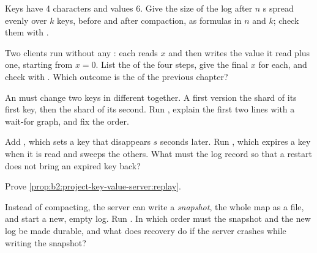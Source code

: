 \begin{exercise}[$\star$]\label{exo:b2:project-key-value-server:4}
Keys have 4 characters and values 6. Give the size of the log after $n$ s spread evenly over $k$ keys, before
and after compaction, as formulas in $n$ and $k$; check them with .
\end{exercise}

\begin{exercise}[$\star\star$]\label{exo:b2:project-key-value-server:5}
Two clients run without any : each reads $x$ and then writes the value it read plus one, starting from $x = 0$. List
the  of the four steps, give the final $x$ for each, and check with . Which outcome
is the  of the previous chapter?
\end{exercise}

\begin{exercise}[$\star\star$]\label{exo:b2:project-key-value-server:6}
An  must change two keys in different  together. A first version  the shard of its first
key, then the shard of its second. Run , explain the first two lines with a wait-for graph,
and fix the order.
\end{exercise}

\begin{exercise}[$\star\star$]\label{exo:b2:project-key-value-server:7}
Add , which sets a key that disappears $s$ seconds later. Run , which expires a key
when it is read and sweeps the others. What must the log record so that a restart does not bring an expired key back?
\end{exercise}

\begin{exercise}[$\star\star$]\label{exo:b2:project-key-value-server:8}
Prove \cref{prop:b2:project-key-value-server:replay}.
\end{exercise}

\begin{exercise}[$\star\star$]\label{exo:b2:project-key-value-server:9}
Instead of compacting, the server can write a \emph{snapshot}, the whole map as a file, and start a new, empty log.
Run . In which order must the snapshot and the new log be made durable, and what does recovery do
if the server crashes while writing the snapshot?
\end{exercise}

